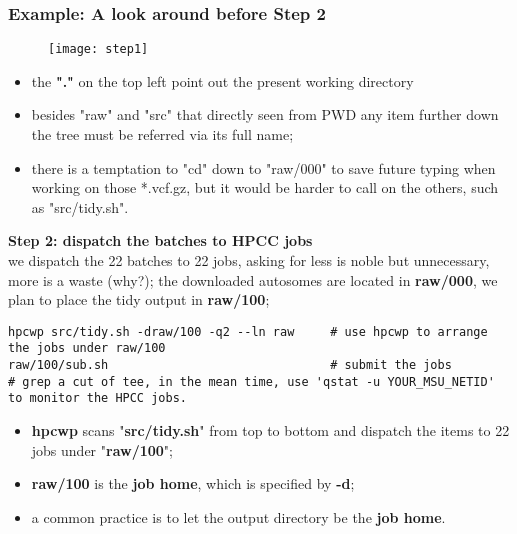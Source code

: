 \documentclass{beamer}
\begin{document}

\begin{frame}[fragile]
\frametitle{Example: A look around before Step 2}
\begin{figure}
\texttt{[image: step1]}
\end{figure}
\begin{itemize}
\item the \textbf{"."} on the top left point out the present working directory
\item besides "raw" and "src" that directly seen from PWD any item further down the tree must be referred via its full name;
\item there is a temptation to "cd" down to "raw/000" to save future typing when working on those
*.vcf.gz, but it would be harder to call on the others, such as "src/tidy.sh".
\end{itemize}

\end{frame}


\begin{frame}[fragile]
\textbf{Step 2: dispatch the batches to HPCC jobs} \\
we dispatch the 22 batches to 22 jobs, asking for less is noble but unnecessary, more is a waste (why?);
the downloaded autosomes are located in \textbf{raw/000}, we plan to place the tidy output in \textbf{raw/100};
\begin{example}
\tiny \begin{verbatim}
hpcwp src/tidy.sh -draw/100 -q2 --ln raw     # use hpcwp to arrange the jobs under raw/100
raw/100/sub.sh                               # submit the jobs
# grep a cut of tee, in the mean time, use 'qstat -u YOUR_MSU_NETID' to monitor the HPCC jobs.
\end{verbatim}
\end{example}
\begin{itemize}
\item \textbf{hpcwp} scans "\textbf{src/tidy.sh}" from top to bottom and dispatch the items to 22 jobs under "\textbf{raw/100}";
\item \textbf{raw/100} is the \textbf{job home}, which is specified by \textbf{-d};
\item a common practice is to let the output directory be the \textbf{job home}.
\end{itemize}
\end{frame}
\end{document}
